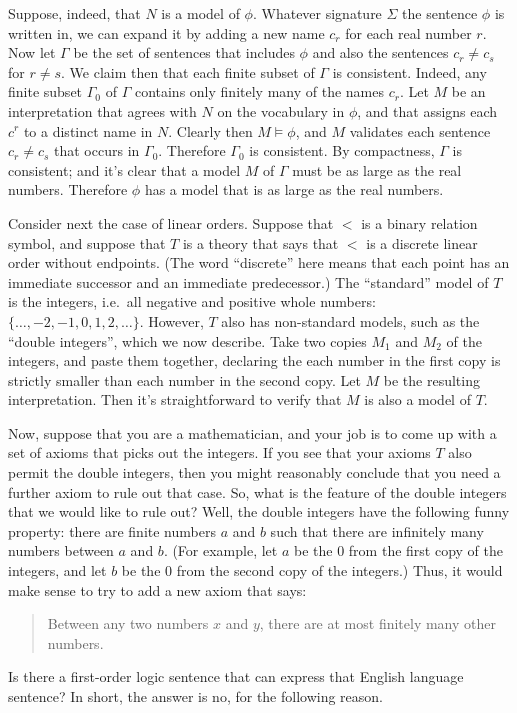 Suppose, indeed, that $N$ is a model of $\phi$.  Whatever signature
$\Sigma$ the sentence $\phi$ is written in, we can expand it by adding
a new name $c_r$ for each real number $r$.  Now let $\Gamma$ be the
set of sentences that includes $\phi$ and also the sentences
$c_r\neq c_s$ for $r\neq s$.  We claim then that each finite subset of
$\Gamma$ is consistent.  Indeed, any finite subset $\Gamma _0$ of
$\Gamma$ contains only finitely many of the names $c_r$.  Let $M$ be
an interpretation that agrees with $N$ on the vocabulary in $\phi$,
and that assigns each $c^r$ to a distinct name in $N$.  Clearly then
$M\vDash\phi$, and $M$ validates each sentence $c_r\neq c_s$ that
occurs in $\Gamma _0$.  Therefore $\Gamma _0$ is consistent.  By
compactness, $\Gamma$ is consistent; and it's clear that a model $M$
of $\Gamma$ must be as large as the real numbers.  Therefore $\phi$
has a model that is as large as the real numbers.


Consider next the case of linear orders.  Suppose that $<$ is a binary
relation symbol, and suppose that $T$ is a theory that says that $<$
is a discrete linear order without endpoints.  (The word ``discrete''
here means that each point has an immediate successor and an immediate
predecessor.)  The ``standard'' model of $T$ is the integers, i.e.\
all negative and positive whole numbers:
$\{ \dots ,-2,-1,0,1,2,\dots \}$.  However, $T$ also has non-standard
models, such as the ``double integers'', which we now describe.  Take
two copies $M_1$ and $M_2$ of the integers, and paste them together,
declaring the each number in the first copy is strictly smaller than
each number in the second copy.  Let $M$ be the resulting
interpretation.  Then it's straightforward to verify that $M$ is also
a model of $T$.

Now, suppose that you are a mathematician, and your job is to come up
with a set of axioms that picks out the integers.  If you see that
your axioms $T$ also permit the double integers, then you might
reasonably conclude that you need a further axiom to rule out that
case.  So, what is the feature of the double integers that we would
like to rule out?  Well, the double integers have the following funny
property: there are finite numbers $a$ and $b$ such that there are
infinitely many numbers between $a$ and $b$.  (For example, let $a$ be
the $0$ from the first copy of the integers, and let $b$ be the $0$
from the second copy of the integers.)  Thus, it would make sense to
try to add a new axiom that says:
\begin{quote} Between any two numbers $x$ and $y$, there are at most
  finitely many other numbers. \end{quote} Is there a first-order
logic sentence that can express that English language sentence?  In
short, the answer is no, for the following reason.

